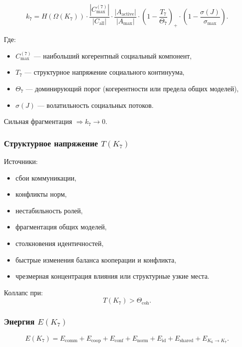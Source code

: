 \[
k_7 =
H(\Omega(K_7))
\cdot
\frac{|C_{\max}^{(7)}|}{|C_{\mathrm{all}}|}
\cdot
\frac{|A_{\mathrm{active}}|}{|A_{\max}|}
\cdot
\left(1-\frac{T_7}{\Theta_7}\right)_+
\cdot
\left(1-\frac{\sigma(J)}{\sigma_{\max}}\right).
\]

Где:
\begin{itemize}
    \item $C_{\max}^{(7)}$ — наибольший когерентный социальный компонент,
    \item $T_7$ — структурное напряжение социального континуума,
    \item $\Theta_7$ — доминирующий порог (когерентности или предела общих моделей),
    \item $\sigma(J)$ — волатильность социальных потоков.
\end{itemize}

Сильная фрагментация $\Rightarrow k_7\to 0$.

\subsubsection{Структурное напряжение \texorpdfstring{$T(K_7)$}{T(K_7)}}

Источники:
\begin{itemize}
    \item сбои коммуникации,
    \item конфликты норм,
    \item нестабильность ролей,
    \item фрагментация общих моделей,
    \item столкновения идентичностей,
    \item быстрые изменения баланса кооперации и конфликта,
    \item чрезмерная концентрация влияния или структурные узкие места.
\end{itemize}

Коллапс при:
\[
T(K_7) > \Theta_{\mathrm{coh}}.
\]

\subsubsection{Энергия \texorpdfstring{$E(K_7)$}{E(K_7)}}

\[
E(K_7)
=
E_{\mathrm{comm}}
+ E_{\mathrm{coop}}
+ E_{\mathrm{conf}}
+ E_{\mathrm{norm}}
+ E_{\mathrm{id}}
+ E_{\mathrm{shared}}
+ E_{K_6\to K_7}.
\]

